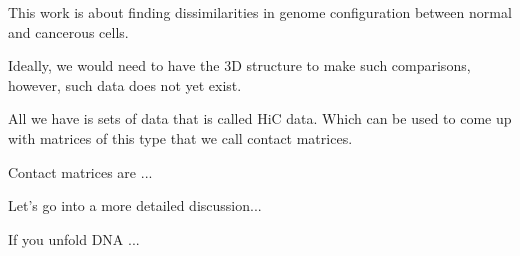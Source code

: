 \documentclass{article}
\begin{document}
\doublespacing
\setlength{\parindent}{0pt}
This work is about finding dissimilarities in genome configuration between normal and cancerous cells.

Ideally, we would need to have the 3D structure to make such comparisons, however, such data does not yet exist.

All we have is sets of data that is called HiC data.
Which can be used to come up with matrices of this type that we call contact matrices.

Contact matrices are ...

Let's go into a more detailed discussion...

If you unfold DNA ...
\end{document}
